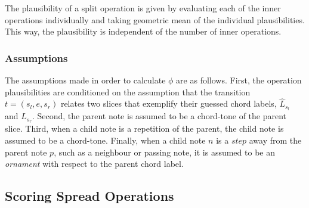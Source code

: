 \documentclass[12pt,a4paper,twoside,openany]{report} \usepackage[pdfborder={0 0 0}]{hyperref}    %
\theoremstyle{definition} \newtheorem{definition}{Definition}[section]
\begin{document}


    The plausibility of a split operation is given by evaluating each of the inner operations
    individually and taking geometric mean of the individual plausibilities. This way, the plausibility is independent
    of the number of inner operations.
    
    \subsubsection{Assumptions}

    The assumptions made in order to calculate $\phi$ are as follows. First, the operation plausibilities are conditioned on the assumption that the transition $t = (s_l, e, s_r)$ relates two slices that exemplify their guessed chord labels, $\hat{L}_{s_l}$ and $\hat{L}_{s_r}$. 
    Second, the parent note is assumed to be a chord-tone of the parent slice.
    Third, when a child note is a repetition of the parent, the child note is assumed to be a chord-tone. Finally,
    when a child note $n$ is a $step$ away from the parent note $p$, such as a neighbour or passing note, it is
    assumed to be an \textit{ornament} with respect to the parent chord label. 

    \subsection{Scoring Spread Operations}

\end{document}
